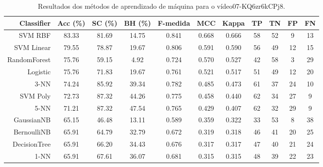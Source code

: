 \begin{table}[!htb]
\centering
\caption{Resultados dos métodos de aprendizado de máquina para o vídeo07-KQ6zr6kCPj8.}
\label{tab:07-KQ6zr6kCPj8}
\begin{tabular}{r|c|c|c|c|c|c|c|c|c|c}
\hline\hline
Classifier & Acc (\%) & SC (\%) & BH (\%) & F-medida & MCC & Kappa & TP & TN & FP & FN \\ \hline
SVM RBF & 83.33 & 81.69 & 14.75 & 0.841 & 0.668 & 0.666 & 58 & 52 & 9 & 13 \\ 
SVM Linear & 79.55 & 78.87 & 19.67 & 0.806 & 0.591 & 0.590 & 56 & 49 & 12 & 15 \\ 
RandomForest & 75.76 & 59.15 & 4.92 & 0.724 & 0.570 & 0.527 & 42 & 58 & 3 & 29 \\ 
Logistic & 75.76 & 71.83 & 19.67 & 0.761 & 0.521 & 0.517 & 51 & 49 & 12 & 20 \\ 
3-NN & 74.24 & 85.92 & 39.34 & 0.782 & 0.485 & 0.473 & 61 & 37 & 24 & 10 \\ 
SVM Poly & 72.73 & 87.32 & 44.26 & 0.775 & 0.458 & 0.440 & 62 & 34 & 27 & 9 \\ 
5-NN & 71.21 & 87.32 & 47.54 & 0.765 & 0.429 & 0.407 & 62 & 32 & 29 & 9 \\ 
GaussianNB & 65.15 & 46.48 & 13.11 & 0.589 & 0.359 & 0.322 & 33 & 53 & 8 & 38 \\ 
BernoulliNB & 65.91 & 64.79 & 32.79 & 0.672 & 0.319 & 0.318 & 46 & 41 & 20 & 25 \\ 
DecisionTree & 65.91 & 66.20 & 34.43 & 0.676 & 0.317 & 0.317 & 47 & 40 & 21 & 24 \\ 
1-NN & 65.91 & 67.61 & 36.07 & 0.681 & 0.315 & 0.315 & 48 & 39 & 22 & 23 \\ 
\hline\hline
\end{tabular}
\end{table}
